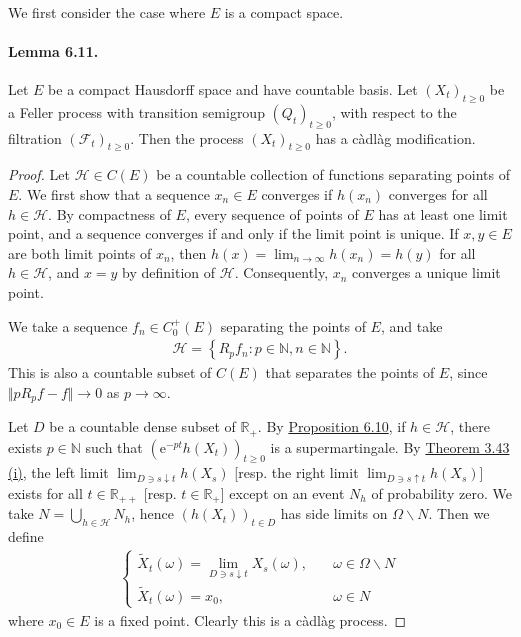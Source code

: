 \documentclass{article}
\numberwithin{equation}{section}
\newcommand{\e}{\mathrm{e}}
\theoremstyle{plain}
\theoremstyle{definition}
\begin{document}
\paragraph{} We first consider the case where $E$ is a compact space.

\paragraph{Lemma 6.11.\label{lemma:6.11}} Let $E$ be a compact Hausdorff space and have countable basis. Let $(X_t)_{t\geq 0}$ be a Feller process with transition semigroup $(Q_t)_{t\geq 0}$, with respect to the filtration $(\mathscr{F}_t)_{t\geq 0}$. Then the process $(X_t)_{t\geq 0}$ has a càdlàg modification.
\begin{proof}
Let $\mathscr{H}\in C(E)$ be a countable collection of functions separating points of $E$. We first show that a sequence $x_n\in E$ converges if $h(x_n)$ converges for all $h\in\mathscr{H}$. By compactness of $E$, every sequence of points of $E$ has at least one limit point, and a sequence converges if and only if the limit point is unique. If $x,y\in E$ are both limit points of $x_n$, then $h(x)=\lim_{n\to\infty} h(x_n)=h(y)$ for all $h\in\mathscr{H}$, and $x=y$ by definition of $\mathscr{H}$. Consequently, $x_n$ converges a unique limit point.

We take a sequence $f_n\in C_0^+(E)$ separating the points of $E$, and take \begin{align*}
	\mathscr{H}=\left\{R_pf_n:p\in\mathbb{N},n\in\mathbb{N}\right\}.
\end{align*}
This is also a countable subset of $C(E)$ that separates the points of $E$, since $\Vert pR_pf-f\Vert\to 0$ as $p\to\infty$.

Let $D$ be a countable dense subset of $\mathbb{R}_+$. By \hyperref[prop:6.10]{Proposition 6.10}, if $h\in\mathscr{H}$, there exists $p\in\mathbb{N}$ such that $(\e^{-pt}h(X_t))_{t\geq 0}$ is a supermartingale. By \hyperref[thm:3.43]{Theorem 3.43 (i)}, the left limit $\lim_{D\ni s\downarrow t}h(X_s)$ [resp. the right limit $\lim_{D\ni s\uparrow t}h(X_s)$] exists for all $t\in\mathbb{R}_{++}$ [resp. $t\in\mathbb{R}_+$] except on an event $N_h$ of probability zero. We take $N=\bigcup_{h\in\mathscr{H}}N_h$, hence $(h(X_t))_{t\in D}$ has side limits on $\Omega\backslash N$. Then we define 
\begin{align*}
	\begin{cases}
		\widetilde{X}_t(\omega)=\lim_{D\ni s\downarrow t}X_s(\omega),\quad
		&\omega\in\Omega\backslash N\\
		\widetilde{X}_t(\omega)=x_0,\quad &\omega\in N
	\end{cases}
\end{align*}
where $x_0\in E$ is a fixed point. Clearly this is a càdlàg process. 


\end{proof}
\end{document}
